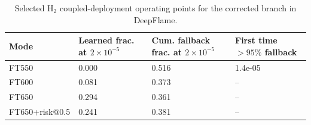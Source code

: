 \begin{table}[t]
\centering
\small
\caption{Selected H$_2$ coupled-deployment operating points for the corrected branch in DeepFlame.}
\label{tab:h2-deployment-summary}
\begin{tabular}{p{2.5cm}p{2.8cm}p{3.4cm}p{2.2cm}}
\toprule
Mode & Learned frac. at $2\times10^{-5}$ & Cum. fallback frac. at $2\times10^{-5}$ & First time $>95\%$ fallback \\
\midrule
FT550 & 0.000 & 0.516 & 1.4e-05 \\
FT600 & 0.081 & 0.373 & -- \\
FT650 & 0.294 & 0.361 & -- \\
FT650+risk@0.5 & 0.241 & 0.381 & -- \\
\bottomrule
\end{tabular}
\end{table}
